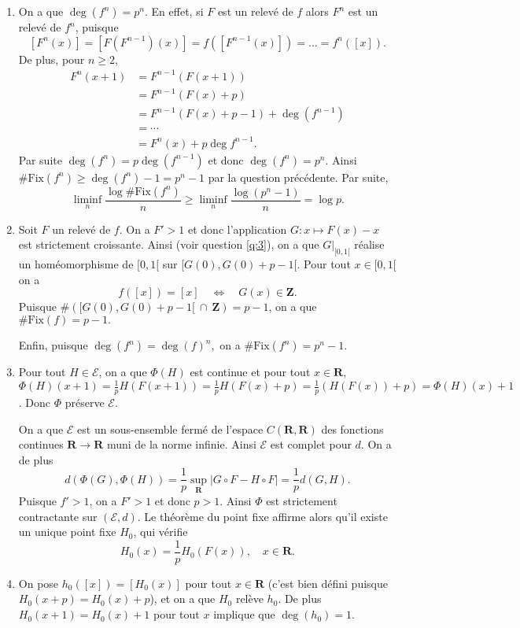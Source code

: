 \documentclass[a4paper,12pt,openany]{article}
\theoremstyle{plain}
\theoremstyle{definition}
\newcommand{\R}{\mathbf{R}}
\newcommand{\Z}{\mathbf{Z}}
\begin{document}
\begin{enumerate}
\item On a que $\deg(f^n) = p^n.$ En effet, si $F$ est un relev\'e de $f$ alors $F^n$ est un relev\'e de $f^n$, puisque
$$
[F^n(x)] = [F(F^{n-1})(x)] = f([F^{n-1}(x)]) = \dots = f^n([x]).
$$
De plus, pour $n \geq 2,$
$$
\begin{aligned}
F^{n}(x+1) &= F^{n-1}(F(x+1)) \\ &= F^{n-1}(F(x) + p) \\ &= F^{n-1}(F(x) + p - 1) + \deg(f^{n-1})  \\ &= \cdots \\ &= F^{n}(x) + p \deg f^{n-1}.
\end{aligned}
$$
Par suite $\deg(f^n) = p \deg(f^{n-1})$ et donc $\deg(f^n) = p^n.$
Ainsi $\#\mathrm{Fix}(f^n) \geq \deg(f^n) - 1 = p^n - 1$ par la question pr\'ec\'edente. Par suite,
$$
\liminf_n \frac{\log \#\mathrm{Fix}(f^n)}{n} \geq  \liminf_n \frac{\log(p^n-1)}{n} = \log p.
$$

\item Soit $F$ un relev\'e de $f$. On a $F' > 1$ et donc l'application $G : x \mapsto F(x)-x$ est strictement croissante. Ainsi (voir question \ref{q:3}), on a que $G|_{[0, 1[}$ r\'ealise un hom\'eomorphisme de $[0, 1[$ sur $[G(0), G(0) + p -1[$. Pour tout $x \in [0,1[$ on a 
$$
f([x]) = [x] \quad \iff \quad G(x) \in \Z.
$$
Puisque $\#([G(0), G(0) + p -1[ ~\cap ~\Z) = p - 1$, on a que $\# \mathrm{Fix}(f) = p -1.$ 

Enfin, puisque $\deg(f^n) = \deg(f)^n,$ on a $\#\mathrm{Fix}(f^n) = p^n-1.$

\item Pour tout $H \in \mathcal{E}$, on a que $\Phi(H)$ est continue et pour tout $x \in \R$, $\Phi(H)(x+1) = \frac{1}{p} H(F(x+1)) = \frac{1}{p}H(F(x) + p) = \frac{1}{p}(H(F(x)) + p) = \Phi(H)(x) + 1$. Donc $\Phi$ pr\'eserve $\mathcal{E}$.

On a que $\mathcal{E}$ est un sous-ensemble ferm\'e de l'espace $C(\R, \R)$ des fonctions continues $\R \to \R$ muni de la norme infinie. Ainsi $\mathcal{E}$ est complet pour $d$. On a de plus
$$
d(\Phi(G), \Phi(H)) = \frac{1}{p}\sup_\R |G \circ F - H \circ F| = \frac{1}{p} d(G,H).
$$
Puisque $f'>1$, on a $F'>1$ et donc $p > 1$. Ainsi $\Phi$ est strictement contractante sur $(\mathcal{E},d)$. Le th\'eor\`eme du point fixe affirme alors qu'il existe un unique point fixe $H_0$, qui v\'erifie 
$$
H_0(x) = \frac{1}{p} H_0(F(x)), \quad x \in \R.
$$

\item On pose $h_0([x]) = [H_0(x)]$ pour tout $x \in \R$ (c'est bien d\'efini puisque $H_0(x+p) = H_0(x) + p$), et on a que $H_0$ rel\`eve $h_0$. De plus $H_0(x+1) = H_0(x) + 1$ pour tout $x$ implique que $\deg(h_0) = 1$.


\end{enumerate}
\end{document}
